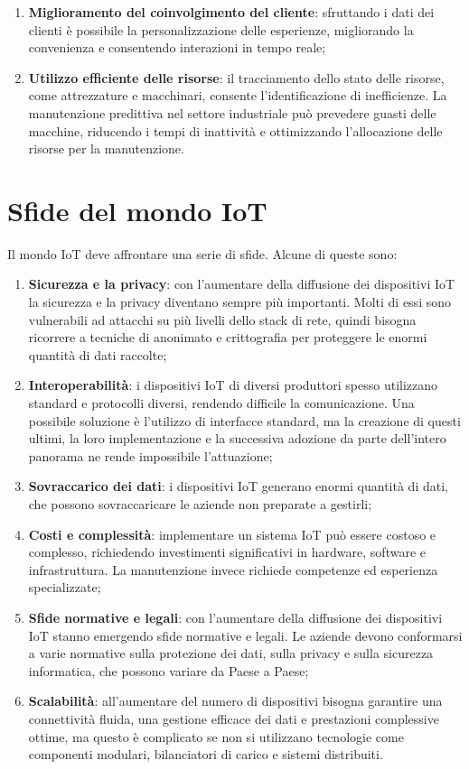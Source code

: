 \begin{enumerate}
    \item \textbf{Miglioramento del coinvolgimento del cliente}: sfruttando i dati dei clienti è possibile la personalizzazione delle esperienze, migliorando la convenienza e consentendo interazioni in tempo reale;
    \item \textbf{Utilizzo efficiente delle risorse}: il tracciamento dello stato delle risorse, come attrezzature e macchinari, consente l'identificazione di inefficienze. La manutenzione predittiva nel settore industriale può prevedere guasti delle macchine, riducendo i tempi di inattività e ottimizzando l'allocazione delle risorse per la manutenzione.
\end{enumerate}

\section{Sfide del mondo IoT}

Il mondo IoT deve affrontare una serie di sfide. Alcune di queste sono\cite{iot-challenge-1}\cite{iot-challenge-2}:
\begin{enumerate}
    \item \textbf{Sicurezza e la privacy}: con l'aumentare della diffusione dei dispositivi IoT la sicurezza e la privacy diventano sempre più importanti. Molti di essi sono vulnerabili ad attacchi su più livelli dello stack di rete, quindi bisogna ricorrere a tecniche di anonimato e crittografia per proteggere le enormi quantità di dati raccolte;
    \item \textbf{Interoperabilità}: i dispositivi IoT di diversi produttori spesso utilizzano standard e protocolli diversi, rendendo difficile la comunicazione. Una possibile soluzione è l'utilizzo di interfacce standard, ma la creazione di questi ultimi, la loro implementazione e la successiva adozione da parte dell'intero panorama ne rende impossibile l'attuazione;
    \item \textbf{Sovraccarico dei dati}: i dispositivi IoT generano enormi quantità di dati, che possono sovraccaricare le aziende non preparate a gestirli;
    \item \textbf{Costi e complessità}: implementare un sistema IoT può essere costoso e complesso, richiedendo investimenti significativi in hardware, software e infrastruttura. La manutenzione invece richiede competenze ed esperienza specializzate;
    \item \textbf{Sfide normative e legali}: con l'aumentare della diffusione dei dispositivi IoT stanno emergendo sfide normative e legali. Le aziende devono conformarsi a varie normative sulla protezione dei dati, sulla privacy e sulla sicurezza informatica, che possono variare da Paese a Paese;
    \item \textbf{Scalabilità}: all'aumentare del numero di dispositivi bisogna garantire una connettività fluida, una gestione efficace dei dati e prestazioni complessive ottime, ma questo è complicato se non si utilizzano tecnologie come componenti modulari, bilanciatori di carico e sistemi distribuiti.
\end{enumerate} 
